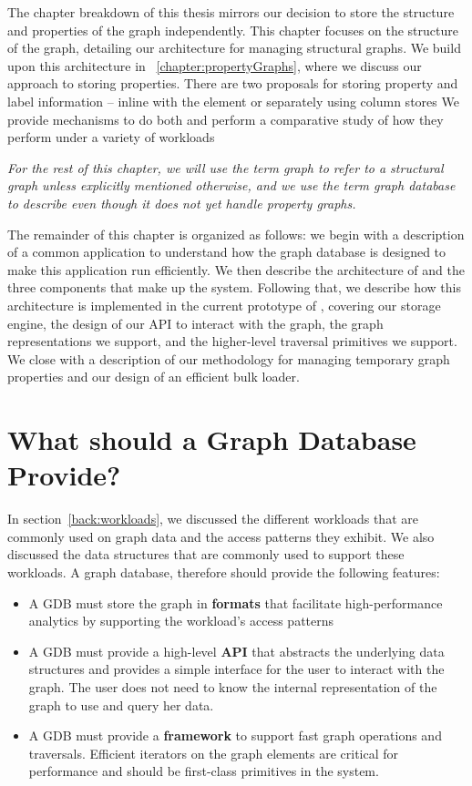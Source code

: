 The chapter breakdown of this thesis mirrors our decision to store the structure and properties of the graph independently.
This chapter focuses on the structure of the graph, detailing our architecture for managing structural graphs.
We build upon this architecture in ~\autoref{chapter:propertyGraphs}, where we discuss our approach to storing properties.
There are two proposals for storing property and label information – inline with the element or separately using column stores
We provide mechanisms to do both and perform a comparative study of how they perform under a variety of workloads

\emph{For the rest of this chapter, we will use the term graph to refer to a structural graph unless explicitly mentioned otherwise, and we use the term graph database to describe \project{} even though it does not yet handle property graphs.}

The remainder of this chapter is organized as follows: we begin with a description of a common application to understand how the graph database is designed to make this application run efficiently.
We then describe the architecture of \project{} and the three components that make up the system.
Following that, we describe how this architecture is implemented in the current prototype of \project{}, covering our storage engine, the design of our API to interact with the graph, the graph representations we support, and the higher-level traversal primitives we support.
We close with a description of our methodology for managing temporary graph properties and our design of an efficient bulk loader.

\section{What should a Graph Database Provide?}
In section~\autoref{back:workloads}, we discussed the different workloads that are commonly used on graph data and the access patterns they exhibit.
We also discussed the data structures that are commonly used to support these workloads.
A graph database, therefore should provide the following features:
\begin{itemize}
\item A GDB must store the graph in \textbf{formats} that facilitate high-performance analytics by supporting the workload’s access patterns 
\item A GDB must provide a high-level \textbf{API} that abstracts the underlying data structures and provides a simple interface for the user to interact with the graph. The user does not need to know the internal representation of the graph to use and query her data.
\item A GDB must provide a \textbf{framework} to support fast graph operations and traversals. Efficient iterators on the graph elements are critical for performance and should be first-class primitives in the system.
\end{itemize}


